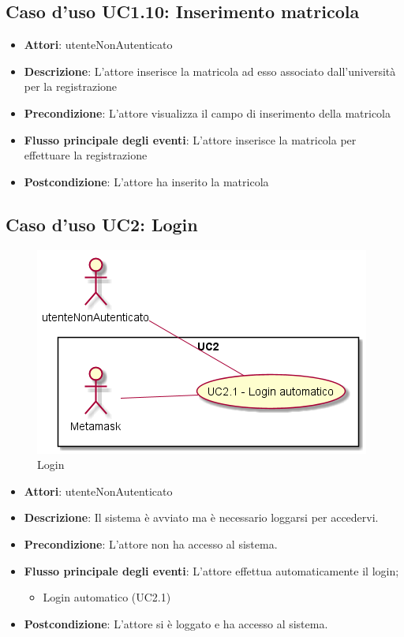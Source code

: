 \subsection{Caso d'uso \texorpdfstring{UC1.10}{UC1.10}: Inserimento matricola}
\begin{itemize}
\item \textbf{Attori}: utenteNonAutenticato
\item \textbf{Descrizione}: L'attore inserisce la matricola ad esso associato dall'università per la registrazione
\item \textbf{Precondizione}: L'attore visualizza il campo di inserimento della matricola
\item \textbf{Flusso principale degli eventi}: L'attore inserisce la matricola per effettuare la registrazione
\item \textbf{Postcondizione}: L'attore ha inserito la matricola
\end{itemize}
\subsection{Caso d'uso \texorpdfstring{UC2}{UC2}: Login}
\begin{figure} [H]
\centering
\includegraphics[scale=0.45]{./img/UC2.png}
\caption{Login}\label{}
\end{figure}
\begin{itemize}
\item \textbf{Attori}: utenteNonAutenticato
\item \textbf{Descrizione}: Il sistema è avviato ma è necessario loggarsi per accedervi.
\item \textbf{Precondizione}: L'attore non ha accesso al sistema.
\item \textbf{Flusso principale degli eventi}: L'attore effettua automaticamente il login;
\begin{itemize}
\item Login automatico (UC2.1)
\end{itemize}
\item \textbf{Postcondizione}: L'attore si è loggato e ha accesso al sistema.
\end{itemize}
